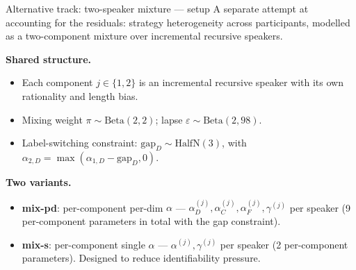 \documentclass[10pt,aspectratio=169]{beamer}
\newcommand{\main}[1]{\textcolor{CSP-main-dark}{\textbf{#1}}}
\begin{document}
\begin{frame}{Alternative track: two-speaker mixture --- setup}
\small
A separate attempt at accounting for the residuals: strategy heterogeneity across participants, modelled as a two-component mixture over incremental recursive speakers.

\vspace{0.5em}
\main{Shared structure.}
\begin{itemize}\itemsep0.1em
  \item Each component $j \in \{1, 2\}$ is an incremental recursive speaker with its own rationality and length bias.
  \item Mixing weight $\pi \sim \mathrm{Beta}(2,2)$; lapse $\varepsilon \sim \mathrm{Beta}(2, 98)$.
  \item Label-switching constraint: $\mathrm{gap}_D \sim \mathrm{HalfN}(3)$, with $\alpha_{2,D} = \max(\alpha_{1,D} - \mathrm{gap}_D, 0)$.
\end{itemize}

\vspace{0.5em}
\main{Two variants.}
\begin{itemize}\itemsep0.1em
  \item \main{mix-pd}: per-component per-dim $\alpha$ --- $\alpha^{(j)}_D, \alpha^{(j)}_C, \alpha^{(j)}_F, \gamma^{(j)}$ per speaker (9 per-component parameters in total with the gap constraint).
  \item \main{mix-s}: per-component single $\alpha$ --- $\alpha^{(j)}, \gamma^{(j)}$ per speaker (2 per-component parameters). Designed to reduce identifiability pressure.
\end{itemize}
\end{frame}
\end{document}
